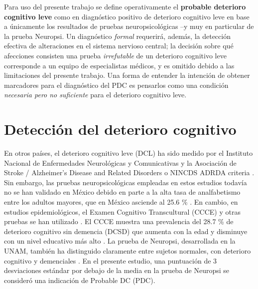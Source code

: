 Para uso del presente trabajo se define operativamente el \textbf{probable deterioro cognitivo leve} como en diagnóstico positivo de deterioro cognitivo leve en base a {únicamente} los resultados de pruebas neuropsicológicas --y muy en particular de la prueba Neuropsi.
%
Un diagnóstico \textit{formal} requerirá, además, la detección efectiva de alteraciones en el sistema nervioso central; la decisión sobre qué afecciones consisten una prueba \textit{irrefutable} de un deterioro cognitivo leve corresponde a un equipo de especialistas médicos, y es omitido debido a las limitaciones del presente trabajo.
%
Una forma de entender la intención de obtener marcadores para el diagnóstico del PDC es pensarlos como una condición \textit{necesaria pero no suficiente} para el deterioro cognitivo leve.


\section{Detección del deterioro cognitivo}

En otros países, el deterioro cognitivo leve (DCL) ha sido medido por el Instituto Nacional de Enfermedades
Neurológicas y Comunicativas y la Asociación de Stroke / Alzheimer's Disease and Related Disorders o NINCDS ADRDA criteria \cite{McKhann}. Sin embargo, las pruebas neuropsicológicas empleadas en estos estudios todavía no se han validado en México debido en parte a la alta tasa de analfabetismo entre los adultos mayores, que en México asciende
al 25.6 \% \cite{CONAPO2010}. En cambio, en estudios epidemiológicos, el Examen Cognitivo Transcultural (CCCE) y otras pruebas se han utilizado \cite{Rosales-Lagarde2016}. El CCCE muestra una prevalencia del 28.7 \% de deterioro cognitivo sin demencia (DCSD) que aumenta con la edad y disminuye con un nivel educativo más alto \cite{Mejia-Arango2011}. La prueba de Neuropsi, desarrollada en la UNAM, también ha distinguido claramente entre sujetos normales, con deterioro cognitivo y demenciales \cite{Ostrosky1999, Abrisqueta, Montes2012}. En el presente estudio, una puntuación de 3 desviaciones estándar por debajo de la media en la prueba de Neuropsi se consideró una indicación de Probable DC (PDC).


